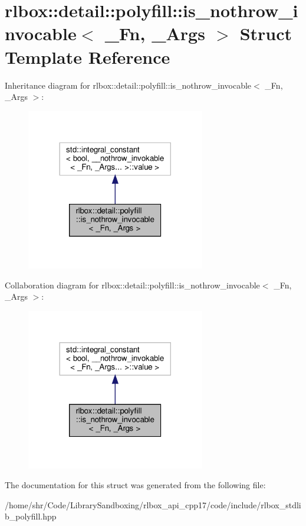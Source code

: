 \hypertarget{structrlbox_1_1detail_1_1polyfill_1_1is__nothrow__invocable}{}\section{rlbox\+:\+:detail\+:\+:polyfill\+:\+:is\+\_\+nothrow\+\_\+invocable$<$ \+\_\+\+Fn, \+\_\+\+Args $>$ Struct Template Reference}
\label{structrlbox_1_1detail_1_1polyfill_1_1is__nothrow__invocable}


Inheritance diagram for rlbox\+:\+:detail\+:\+:polyfill\+:\+:is\+\_\+nothrow\+\_\+invocable$<$ \+\_\+\+Fn, \+\_\+\+Args $>$\+:\nopagebreak
\begin{figure}[H]
\begin{center}
\leavevmode
\includegraphics[width=221pt]{structrlbox_1_1detail_1_1polyfill_1_1is__nothrow__invocable__inherit__graph}
\end{center}
\end{figure}


Collaboration diagram for rlbox\+:\+:detail\+:\+:polyfill\+:\+:is\+\_\+nothrow\+\_\+invocable$<$ \+\_\+\+Fn, \+\_\+\+Args $>$\+:\nopagebreak
\begin{figure}[H]
\begin{center}
\leavevmode
\includegraphics[width=221pt]{structrlbox_1_1detail_1_1polyfill_1_1is__nothrow__invocable__coll__graph}
\end{center}
\end{figure}


The documentation for this struct was generated from the following file\+:\begin{DoxyCompactItemize}
\item 
/home/shr/\+Code/\+Library\+Sandboxing/rlbox\+\_\+api\+\_\+cpp17/code/include/rlbox\+\_\+stdlib\+\_\+polyfill.\+hpp\end{DoxyCompactItemize}
